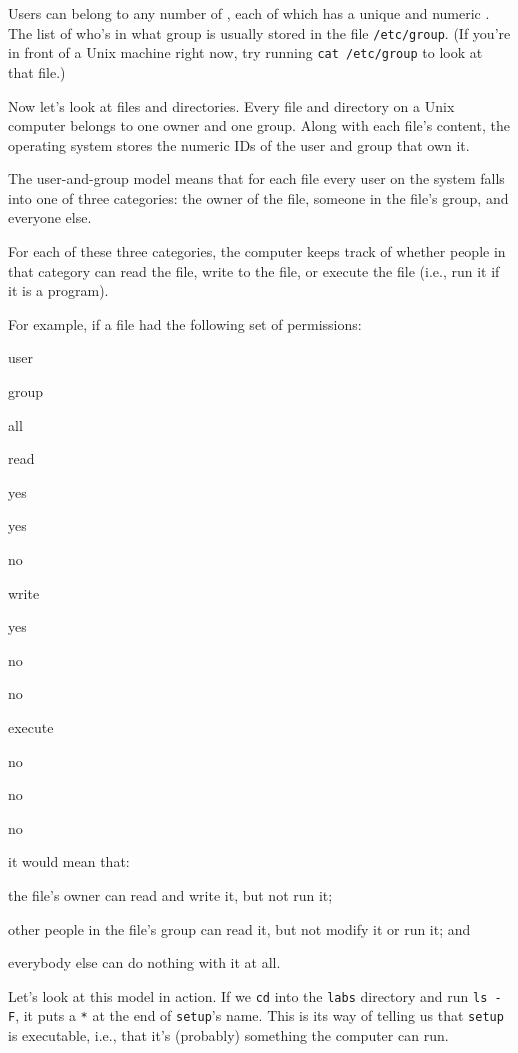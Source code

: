 \documentclass{book}
\begin{document}
Users can belong to any number of , each
of which has a unique  and
numeric . The list of who's in what
group is usually stored in the file \texttt{/etc/group}. (If you're in
front of a Unix machine right now, try running \texttt{cat /etc/group}
to look at that file.)

Now let's look at files and directories. Every file and directory on a
Unix computer belongs to one owner and one group. Along with each file's
content, the operating system stores the numeric IDs of the user and
group that own it.

The user-and-group model means that for each file every user on the
system falls into one of three categories: the owner of the file,
someone in the file's group, and everyone else.

For each of these three categories, the computer keeps track of whether
people in that category can read the file, write to the file, or execute
the file (i.e., run it if it is a program).

For example, if a file had the following set of permissions:

user

group

all

read

yes

yes

no

write

yes

no

no

execute

no

no

no

it would mean that:

\begin{swcitemize}
\item
  the file's owner can read and write it, but not run it;
\item
  other people in the file's group can read it, but not modify it or run
  it; and
\item
  everybody else can do nothing with it at all.
\end{swcitemize}

Let's look at this model in action. If we \texttt{cd} into the
\texttt{labs} directory and run \texttt{ls -F}, it puts a \texttt{*} at
the end of \texttt{setup}'s name. This is its way of telling us that
\texttt{setup} is executable, i.e., that it's (probably) something the
computer can run.
\end{document}
